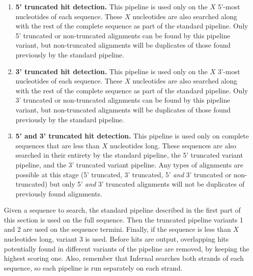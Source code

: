 \begin{enumerate}

\item \textbf{5' truncated hit detection.}
This pipeline is used only on the $X$ 5'-most nucleotides of each
sequence. These $X$ nucleotides are also searched along with the rest
of the complete sequence as part of the standard pipeline. Only 5'
truncated or non-truncated alignments can be found by this pipeline
variant, but non-truncated alignments will be duplicates of
those found previously by the standard pipeline. 

\item  \textbf{3' truncated hit detection.}
This pipeline is used only on the $X$ 3'-most nucleotides of each
sequence. These $X$ nucleotides are also searched along with the rest
of the complete sequence as part of the standard pipeline. Only 3'
truncated or non-truncated alignments can be found by this pipeline
variant, but non-truncated alignments will be duplicates of
those found previously by the standard pipeline. 

\item  \textbf{5' and 3' truncated hit detection.}
This pipeline is used only on complete sequences that are less than
$X$ nucleotides long. These sequences are also searched in their
entirety by the standard pipeline, the 5' truncated variant pipeline,
and the 3' truncated variant pipeline. Any types of alignments are
possible at this stage (5' truncated, 3' truncated, 5' \emph{and} 3'
truncated or non-truncated) but only 5' \emph{and} 3' truncated
alignments will not be duplicates of previously found alignments. 

\end{enumerate}

Given a sequence to search, the standard pipeline described in the
first part of this section is used on the full sequence. Then the
truncated pipeline variants 1 and 2 are used on the sequence
termini. Finally, if the sequence is less than $X$ nucleotides long,
variant 3 is used. Before hits are output, overlapping hits
potentially found in different variants of the pipeline are removed,
by keeping the highest scoring one. Also, remember that Infernal
searches both strands of each sequence, so each pipeline is run
separately on each strand.

